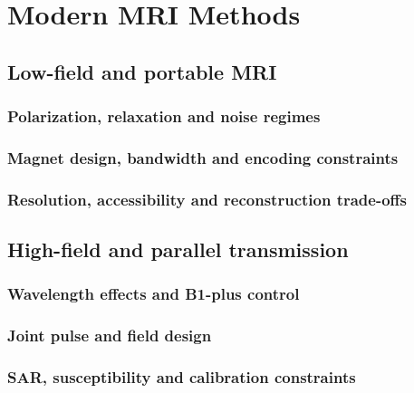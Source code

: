 \chapter{Modern MRI Methods}
\label{ch:25}

\section{Low-field and portable MRI}
\label{sec:25:low-field-and-portable-mri}
\subsection{Polarization, relaxation and noise regimes}
\subsection{Magnet design, bandwidth and encoding constraints}
\subsection{Resolution, accessibility and reconstruction trade-offs}

\section{High-field and parallel transmission}
\label{sec:25:high-field-and-parallel-transmission}
\subsection{Wavelength effects and B1-plus control}
\subsection{Joint pulse and field design}
\subsection{SAR, susceptibility and calibration constraints}

